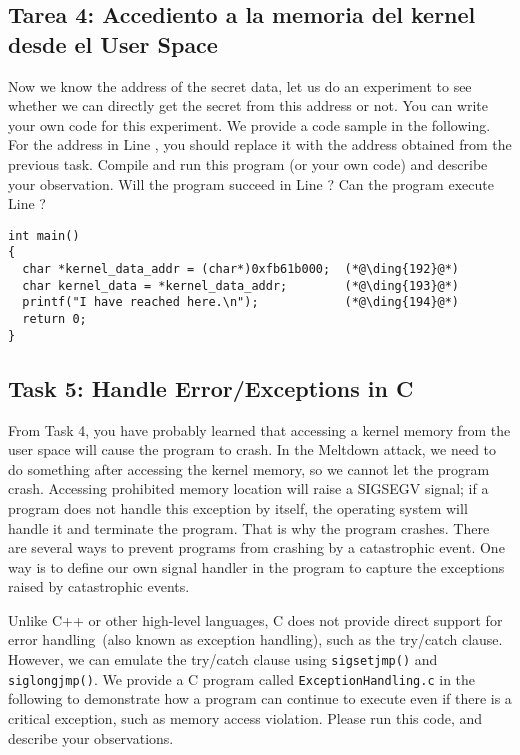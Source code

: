 \subsection{Tarea 4: Accediento a la memoria del kernel desde el User Space}

Now we know the address of the secret data, let us do an experiment to see 
whether we can directly get the secret from this address or not. 
You can write your own code for this experiment. We provide
a code sample in the following. For the address in Line , 
you should replace it with the address obtained from the previous task. 
Compile and run this program (or your own code) and describe your observation. 
Will the program succeed in Line ? Can the program execute 
Line ?

\begin{lstlisting}
int main()
{
  char *kernel_data_addr = (char*)0xfb61b000;  (*@\ding{192}@*)
  char kernel_data = *kernel_data_addr;        (*@\ding{193}@*)
  printf("I have reached here.\n");            (*@\ding{194}@*)
  return 0;
}
\end{lstlisting}



\subsection{Task 5: Handle Error/Exceptions in C}


From Task 4, you have probably learned that accessing a kernel memory from the user space will
cause the program to crash. In the Meltdown attack, we need to do something 
after accessing the kernel memory, so we cannot let the program crash. 
Accessing prohibited memory location will raise a SIGSEGV signal; if a program does not 
handle this exception by itself, the operating system will handle it and terminate the 
program. That is why the program crashes. There are several ways to prevent
programs from crashing by a catastrophic event. 
One way is to define our own signal handler in the program to capture
the exceptions raised by catastrophic events. 


Unlike C++ or other high-level languages, C does not provide direct support
for error handling~(also 
known as exception handling), such as the try/catch clause. 
However, we can emulate the try/catch clause using \texttt{sigsetjmp()} and \texttt{siglongjmp()}.
We provide a C program called \texttt{ExceptionHandling.c} in the following 
to demonstrate how
a program can continue to execute even if there is a critical exception, such as memory access
violation. Please run this code, and describe your observations. 


